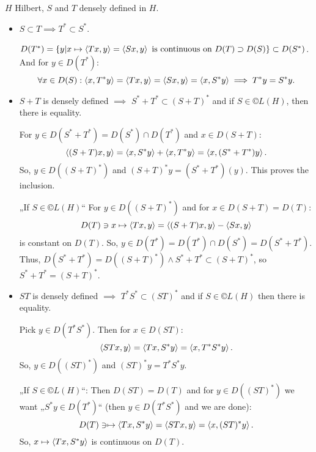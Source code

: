 \documentclass[12pt]{article}					%
\begin{document}

\pagebreak

\begin{tvrzeni}
	$H$ Hilbert, $S$ and $T$ densely defined in $H$.

	\begin{itemize}
		\item $S \subset T \implies T^* \subset S^*$.

			\begin{dukazin}
				$D(T^*) = \{y | x \mapsto\left\langle Tx, y\right\rangle = \left\langle Sx, y\right\rangle \text{ is continuous on } D(T) \supset D(S)\} \subset D(S^*)$. And for $y \in D(T^*)$:
				$$ \forall x \in D(S): \left\langle x, T^* y\right\rangle = \left\langle Tx, y\right\rangle = \left\langle Sx, y\right\rangle = \left\langle x, S^* y\right\rangle \implies T^* y = S^* y. $$
			\end{dukazin}
		\item $S+T$ is densely defined $\implies$ $S^* + T^* \subset (S + T)^*$ and if $S \in ©L(H)$, then there is equality.

			\begin{dukazin}
				For $y \in D(S^* + T^*) = D(S^*) \cap D(T^*)$ and $x \in D(S + T)$:
				$$ \left\langle(S + T) x, y\right\rangle = \left\langle x, S^* y\right\rangle + \left\langle x, T^* y\right\rangle = \left\langle x, (S^* + T^*) y\right\rangle. $$
				So, $y \in D((S + T)^*)$ and $(S+T)^* y = (S^* + T^*)(y)$. This proves the inclusion.

				„If $S \in ©L(H)$“ For $y \in D((S + T)^*)$ and for $x \in D(S + T) = D(T)$:
				$$ D(T) \ni x \mapsto \left\langle Tx, y\right\rangle = \left\langle(S + T)x, y\right\rangle - \left\langle S x, y\right\rangle $$
				is constant on $D(T)$. So, $y \in D(T^*) = D(T^*) \cap D(S^*) = D(S^* + T^*)$. Thus, $D(S^* + T^*) = D((S + T)^*) \land S^* + T^* \subset (S + T)^*$, so $S^* + T^* = (S+T)^*$.
			\end{dukazin}

		\item $ST$ is densely defined $\implies$ $T^* S^* \subset (ST)^*$ and if $S \in ©L(H)$ then there is equality.

			\begin{dukazin}
				Pick $y \in D(T^* S^*)$. Then for $x \in D(ST)$:
				$$ \left\langle STx, y\right\rangle = \left\langle T x, S^* y\right\rangle = \left\langle x, T^*S^* y\right\rangle. $$
				So, $y \in D((ST)^*)$ and $(ST)^* y = T^*S^* y$.

				„If $S \in ©L(H)$“: Then $D(ST) = D(T)$ and for $y \in D((ST)^*)$ we want „$S^*y \in D(T^*)$“ (then $y \in D(T^*S^*)$  and we are done):
				$$ D(T) \ni \mapsto \left\langle Tx, S^* y\right\rangle = \left\langle S T x, y\right\rangle = \left\langle x, (ST)^* y\right\rangle. $$
				So, $x \mapsto \left\langle Tx, S^* y\right\rangle$ is continuous on $D(T)$.
			\end{dukazin}
	\end{itemize}
\end{tvrzeni}
\end{document}
